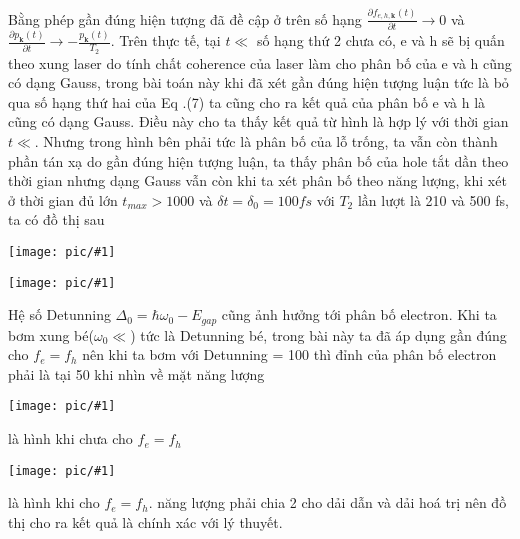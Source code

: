 \documentclass{article}
\newcommand{\image}[1]{
	\begin{center}
		\texttt{[image: pic/\#1]}
	\end{center}
}
\newcommand{\f}[2]{\dfrac{#1}{#2}}
\begin{document}
Bằng phép gần đúng hiện tượng đã đề cập ở trên số hạng $ \frac{\partial f_{e,h,\mathbf{k}}(t)}{\partial t} \rightarrow 0$ và $\frac{\partial p_{\mathbf{k}}(t)}{\partial t} \rightarrow - \frac{p_{\mathbf{k}}(t)}{T_{2}}$.
Trên thực tế, tại $t \ll $ số hạng thứ 2 chưa có, e và h sẽ bị quấn theo xung laser do tính chất coherence của laser làm cho phân bố của e và h cũng có dạng Gauss, trong bài toán này khi đã xét gần đúng hiện tượng luận tức là bỏ qua số hạng thứ hai của Eq .(7) ta cũng cho ra kết quả của phân bố e và h là cũng có dạng Gauss. Điều này cho ta thấy kết quả từ hình là hợp lý với thời gian $t \ll$. Nhưng trong hình bên phải tức là phân bố của lỗ trống, ta vẫn còn thành phần tán xạ do gần đúng hiện tượng luận, ta thấy phân bố của hole tắt dần theo thời gian nhưng dạng Gauss vẫn còn khi ta xét phân bố theo năng lượng, khi xét ở thời gian đủ lớn $t_{max} > 1000$ và $\delta {t} = \delta_{0} = 100 fs$ với $T_2$ lần lượt là 210 và 500 fs, ta có đồ thị sau
\image{pic8.png}
\image{pic7.png}
Hệ số Detunning $\Delta_{0} = \hbar \omega_{0} - E_{gap}$ cũng ảnh hưởng tới phân bố electron. Khi ta bơm xung bé($\omega_{0} \ll$) tức là Detunning bé, trong bài này ta đã áp dụng gần đúng cho $f_{e} = f_{h}$ nên khi ta bơm với Detunning = 100 thì đỉnh của phân bố electron phải là tại 50 khi nhìn về mặt năng lượng
\image{pic5.png}
là hình khi chưa cho $f_e = f_{h}$
\image{pic6.png}
là hình khi cho $f_e = f_{h}$. năng lượng phải chia 2 cho dải dẫn và dải hoá trị nên đồ thị cho ra kết quả là chính xác với lý thuyết.

%
\end{document}
